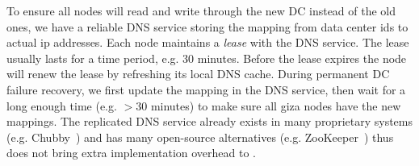 To ensure all \name nodes will read and write through the new DC instead of the
old ones, we have a reliable DNS service storing the mapping from data center
ids to actual ip addresses. Each \name node maintains a {\em lease} with the DNS
service. The lease usually lasts for a time period, e.g. 30 minutes. Before the
lease expires the node will renew the lease by refreshing its local DNS cache.
During permanent DC failure recovery, we first update the mapping in the DNS
service, then wait for a long enough time (e.g. $>$30 minutes) to make sure all
giza nodes have the new mappings. The replicated DNS service already exists in
many proprietary systems (e.g. Chubby~\cite{chubby:osdi06}) and has many open-source
alternatives (e.g. ZooKeeper~\cite{zookeeper:atc10}) thus does not bring extra 
implementation overhead to \name.






